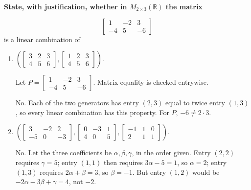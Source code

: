 \providecommand{\rank}{\operatorname{r}}
\providecommand{\RR}{\mathbb R}
\providecommand{\CC}{\mathbb C}
\providecommand{\KK}{\mathbb K}

\setcounter{enumi}{67}
\item {\bfseries\boldmath
State, with justification, whether in $M_{2\times3}(\RR)$ the matrix
}

\[
\begin{bmatrix}1&-2&3\\-4&5&-6\end{bmatrix}
\]
is a linear combination of

\begin{enumerate}[label=\alph*)]

\item $\left(\begin{bmatrix}3&2&3\\4&5&6\end{bmatrix},\begin{bmatrix}1&2&3\\4&5&6\end{bmatrix}\right)$.

\begin{answer}
Let $P=\begin{bmatrix}1&-2&3\\-4&5&-6\end{bmatrix}$.
Matrix equality is checked entrywise.

No. Each of the two generators has entry $(2,3)$ equal to twice entry
$(1,3)$, so every linear combination has this property. For $P$, $-6\ne2\cdot3$.
\end{answer}

\item $\left(\begin{bmatrix}3&-2&2\\-5&0&-3\end{bmatrix},\begin{bmatrix}0&-3&1\\4&0&5\end{bmatrix},\begin{bmatrix}-1&1&0\\2&1&1\end{bmatrix}\right)$.

\begin{answer}
No. Let the three coefficients be $\alpha,\beta,\gamma$, in the order
given. Entry $(2,2)$ requires $\gamma=5$; entry $(1,1)$ then requires
$3\alpha-5=1$, so $\alpha=2$; entry $(1,3)$ requires $2\alpha+\beta=3$,
so $\beta=-1$. But entry $(1,2)$ would be
$-2\alpha-3\beta+\gamma=4$, not $-2$.
\end{answer}


\end{enumerate}
